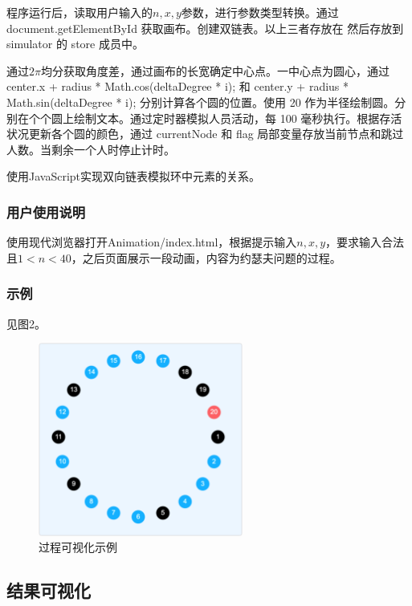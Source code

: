 \documentclass{article}
\begin{document}
程序运行后，读取用户输入的$n, x, y$参数，进行参数类型转换。通过  document.getElementById 获取画布。创建双链表。以上三者存放在 然后存放到 simulator 的 store 成员中。

通过$2\pi$均分获取角度差，通过画布的长宽确定中心点。一中心点为圆心，通过 center.x + radius * Math.cos(deltaDegree * i); 和 center.y + radius * Math.sin(deltaDegree * i); 分别计算各个圆的位置。使用 20 作为半径绘制圆。分别在个个圆上绘制文本。通过定时器模拟人员活动，每 100 毫秒执行。根据存活状况更新各个圆的颜色，通过 currentNode 和 flag 局部变量存放当前节点和跳过人数。当剩余一个人时停止计时。

使用JavaScript实现双向链表模拟环中元素的关系。

\subsubsection{用户使用说明}

使用现代浏览器打开Animation/index.html，根据提示输入$n, x, y$，要求输入合法且$1 < n < 40$，之后页面展示一段动画，内容为约瑟夫问题的过程。

\subsubsection{示例}

见图2。

\begin{figure}[htbp]
    
    \centering\includegraphics[width=0.6\textwidth]{./Images/Animation.png}
    
    \caption{过程可视化示例}
    
\end{figure}

\subsection{结果可视化}
\end{document}
